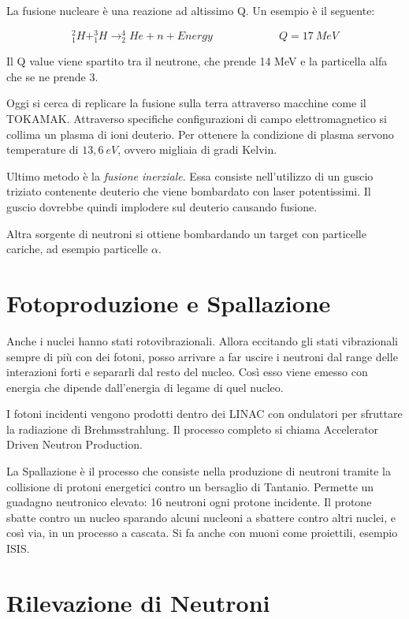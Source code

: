 \documentclass [a4paper, twoside] {book}
\begin{document}
La fusione nucleare è una reazione ad altissimo Q. Un esempio è il seguente:

\begin{equation}
_1^2H+_1^3H \longrightarrow _2^4He+n+Energy \qquad \qquad \qquad Q=17\ MeV
\end{equation}

Il Q value viene spartito tra il neutrone, che prende 14 MeV e la particella alfa che se ne prende 3. 

Oggi si cerca di replicare la fusione sulla terra attraverso macchine come il TOKAMAK. Attraverso specifiche configurazioni di campo elettromagnetico si collima un plasma di ioni deuterio. Per ottenere la condizione di plasma servono temperature di $13,6 \ eV$, ovvero migliaia di gradi Kelvin. 

Ultimo metodo è la \emph{fusione inerziale}. Essa consiste nell'utilizzo di un guscio triziato contenente deuterio che viene bombardato con laser potentissimi. Il guscio dovrebbe quindi implodere sul deuterio causando fusione.


Altra sorgente di neutroni si ottiene bombardando un target con particelle cariche, ad esempio particelle $\alpha$. 

\section{Fotoproduzione e Spallazione}

Anche i nuclei hanno stati rotovibrazionali. Allora eccitando gli stati vibrazionali sempre di più con dei fotoni, posso arrivare a far uscire i neutroni dal range delle interazioni forti e separarli dal resto del nucleo. Così esso viene emesso con energia che dipende dall'energia di legame di quel nucleo.

I fotoni incidenti vengono prodotti dentro dei LINAC con ondulatori per sfruttare la radiazione di Brehmsstrahlung. Il processo completo si chiama Accelerator Driven Neutron Production.


La Spallazione è il processo che consiste nella produzione di neutroni tramite la collisione di protoni energetici contro un bersaglio di Tantanio.  Permette un guadagno neutronico elevato: 16 neutroni ogni protone incidente. Il protone sbatte contro un nucleo sparando alcuni nucleoni a sbattere contro altri nuclei, e così via, in un processo a cascata. Si fa anche con muoni come proiettili, esempio ISIS.

\section{Rilevazione di Neutroni}
\end{document}
